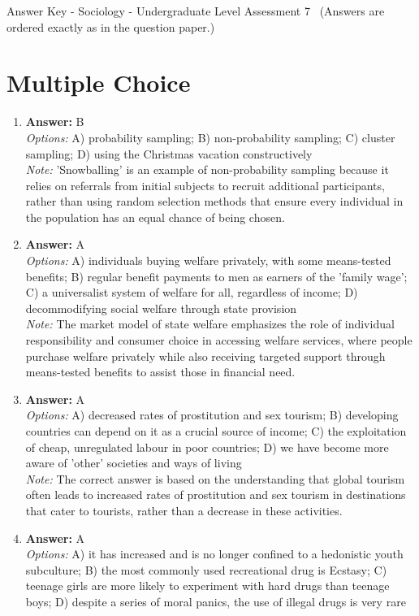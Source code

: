 \documentclass[12pt]{article}
\begin{document}
\begin{center}
Answer Key - Sociology - Undergraduate Level Assessment 7 \
\small (Answers are ordered exactly as in the question paper.)
\end{center}

\section*{Multiple Choice}
\begin{enumerate}[label=\arabic*.]
\item \textbf{Answer:} B
\\ \textit{Options:} A) probability sampling; B) non-probability sampling; C) cluster sampling; D) using the Christmas vacation constructively
\\ \textit{Note:} 'Snowballing' is an example of non-probability sampling because it relies on referrals from initial subjects to recruit additional participants, rather than using random selection methods that ensure every individual in the population has an equal chance of being chosen.
\item \textbf{Answer:} A
\\ \textit{Options:} A) individuals buying welfare privately, with some means-tested benefits; B) regular benefit payments to men as earners of the 'family wage'; C) a universalist system of welfare for all, regardless of income; D) decommodifying social welfare through state provision
\\ \textit{Note:} The market model of state welfare emphasizes the role of individual responsibility and consumer choice in accessing welfare services, where people purchase welfare privately while also receiving targeted support through means-tested benefits to assist those in financial need.
\item \textbf{Answer:} A
\\ \textit{Options:} A) decreased rates of prostitution and sex tourism; B) developing countries can depend on it as a crucial source of income; C) the exploitation of cheap, unregulated labour in poor countries; D) we have become more aware of 'other' societies and ways of living
\\ \textit{Note:} The correct answer is based on the understanding that global tourism often leads to increased rates of prostitution and sex tourism in destinations that cater to tourists, rather than a decrease in these activities.
\item \textbf{Answer:} A
\\ \textit{Options:} A) it has increased and is no longer confined to a hedonistic youth subculture; B) the most commonly used recreational drug is Ecstasy; C) teenage girls are more likely to experiment with hard drugs than teenage boys; D) despite a series of moral panics, the use of illegal drugs is very rare

\end{enumerate}
\end{document}
